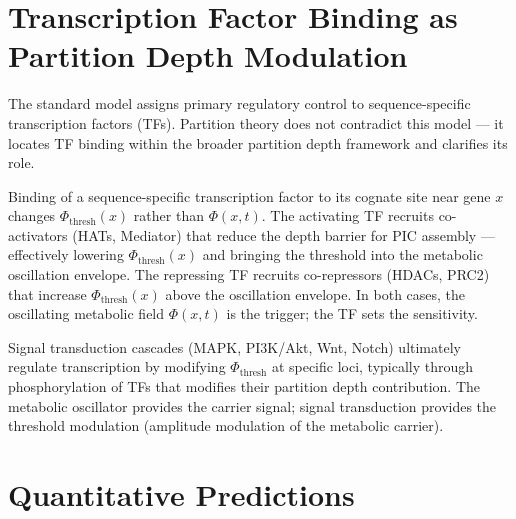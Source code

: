 \section{Transcription Factor Binding as Partition Depth Modulation}
\label{sec:tf_binding}

The standard model assigns primary regulatory control to sequence-specific
transcription factors (TFs). Partition theory does not contradict this model
--- it locates TF binding within the broader partition depth framework and
clarifies its role.

\begin{proposition}
\label{prop:tf_threshold}
Binding of a sequence-specific transcription factor to its cognate site near
gene $x$ changes $\Phi_{\mathrm{thresh}}(x)$ rather than $\Phi(x,t)$. The
activating TF recruits co-activators (HATs, Mediator) that reduce the depth
barrier for PIC assembly --- effectively lowering $\Phi_{\mathrm{thresh}}(x)$
and bringing the threshold into the metabolic oscillation envelope. The
repressing TF recruits co-repressors (HDACs, PRC2) that increase
$\Phi_{\mathrm{thresh}}(x)$ above the oscillation envelope. In both cases,
the oscillating metabolic field $\Phi(x,t)$ is the trigger; the TF sets the
sensitivity.
\end{proposition}

\begin{corollary}
\label{cor:signal_transduction}
Signal transduction cascades (MAPK, PI3K/Akt, Wnt, Notch) ultimately
regulate transcription by modifying $\Phi_{\mathrm{thresh}}$ at specific
loci, typically through phosphorylation of TFs that modifies their
partition depth contribution. The metabolic oscillator provides the carrier
signal; signal transduction provides the threshold modulation (amplitude
modulation of the metabolic carrier).
\end{corollary}

\section{Quantitative Predictions}
\label{sec:bursting_predictions}

